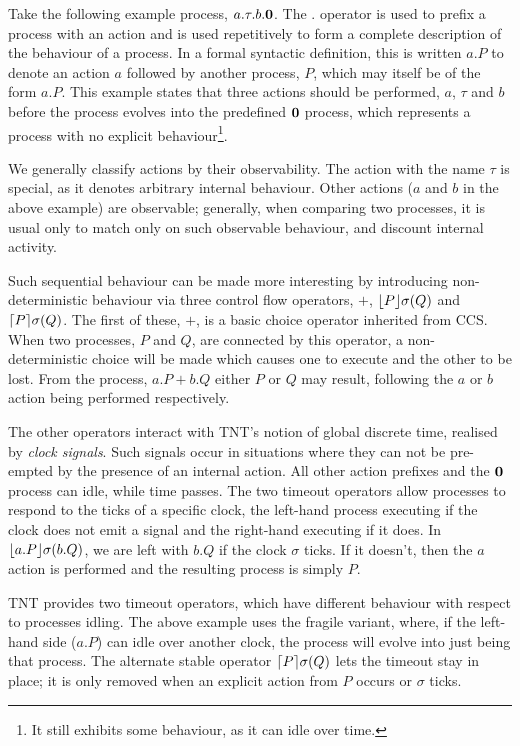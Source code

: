 \documentclass{acm_proc_article-sp}
\begin{document}
Take the following example process, $a.\tau.b.\textbf{0}$.  The $.$ operator
is used to prefix a process with an action and is used repetitively to
form a complete description of the behaviour of a process.  In a formal
syntactic definition, this is written $a.P$ to denote an action $a$
followed by another process, $P$, which may itself be of the form $a.P$.
This example states that three actions should be performed, $a$, $\tau$
and $b$ before the process evolves into the predefined $\textbf{0}$ process,
which represents a process with no explicit behaviour\footnote{It still
exhibits some behaviour, as it can idle over time.}.

We generally classify actions by their observability.  The action with
the name $\tau$ is special, as it denotes arbitrary internal behaviour.
Other actions ($a$ and $b$ in the above example) are observable;
generally, when comparing two processes, it is usual only to match only
on such observable behaviour, and discount internal activity.

Such sequential behaviour can be made more interesting by introducing
non-deterministic behaviour via three control flow operators, $+$,
$\lfloor{P}\rfloor {\sigma} ({Q})$ and $\lceil{P}\rceil {\sigma} ({Q})$.  The first of
these, $+$, is a basic choice operator inherited from CCS.  When two
processes, $P$ and $Q$, are connected by this operator, a
non-deterministic choice will be made which causes one to execute and
the other to be lost.  From the process, $a.P + b.Q$ either $P$ or $Q$
may result, following the $a$ or $b$ action being performed
respectively.

The other operators interact with TNT's notion of global discrete time,
realised by \emph{clock signals}.  Such signals occur in situations
where they can not be pre-empted by the presence of an internal action.
All other action prefixes and the $\textbf{0}$ process can idle, while time
passes.  The two timeout operators allow processes to respond to the
ticks of a specific clock, the left-hand process executing if the clock
does not emit a signal and the right-hand executing if it does.  In
$\lfloor{a.P}\rfloor {\sigma} ({b.Q})$, we are left with $b.Q$ if the clock
$\sigma$ ticks.  If it doesn't, then the $a$ action is performed and the
resulting process is simply $P$.

TNT provides two timeout operators, which have different behaviour with
respect to processes idling.  The above example uses the fragile
variant, where, if the left-hand side ($a.P$) can idle over another
clock, the process will evolve into just being that process.  The
alternate stable operator $\lceil{P}\rceil {\sigma} ({Q})$ lets the timeout
stay in place; it is only removed when an explicit action from $P$
occurs or $\sigma$ ticks.
\end{document}
